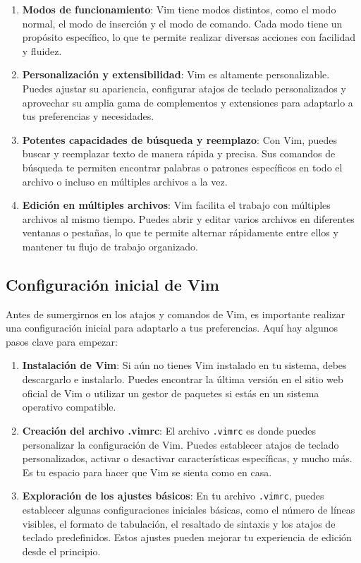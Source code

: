 \documentclass[
  doc,
  floatsintext,
  longtable,
  a4paper,
  nolmodern,
  notxfonts,
  notimes,
  colorlinks=true,linkcolor=blue,citecolor=blue,urlcolor=blue]{apa7}
\begin{document}
\begin{enumerate}
\def\labelenumi{\arabic{enumi}.}
\item
  \textbf{Modos de funcionamiento}: Vim tiene modos distintos, como el
  modo normal, el modo de inserción y el modo de comando. Cada modo
  tiene un propósito específico, lo que te permite realizar diversas
  acciones con facilidad y fluidez.
\item
  \textbf{Personalización y extensibilidad}: Vim es altamente
  personalizable. Puedes ajustar su apariencia, configurar atajos de
  teclado personalizados y aprovechar su amplia gama de complementos y
  extensiones para adaptarlo a tus preferencias y necesidades.
\item
  \textbf{Potentes capacidades de búsqueda y reemplazo}: Con Vim, puedes
  buscar y reemplazar texto de manera rápida y precisa. Sus comandos de
  búsqueda te permiten encontrar palabras o patrones específicos en todo
  el archivo o incluso en múltiples archivos a la vez.
\item
  \textbf{Edición en múltiples archivos}: Vim facilita el trabajo con
  múltiples archivos al mismo tiempo. Puedes abrir y editar varios
  archivos en diferentes ventanas o pestañas, lo que te permite alternar
  rápidamente entre ellos y mantener tu flujo de trabajo organizado.
\end{enumerate}

\subsection{Configuración inicial de
Vim}\label{configuraciuxf3n-inicial-de-vim}

Antes de sumergirnos en los atajos y comandos de Vim, es importante
realizar una configuración inicial para adaptarlo a tus preferencias.
Aquí hay algunos pasos clave para empezar:

\begin{enumerate}
\def\labelenumi{\arabic{enumi}.}
\item
  \textbf{Instalación de Vim}: Si aún no tienes Vim instalado en tu
  sistema, debes descargarlo e instalarlo. Puedes encontrar la última
  versión en el sitio web oficial de Vim o utilizar un gestor de
  paquetes si estás en un sistema operativo compatible.
\item
  \textbf{Creación del archivo .vimrc}: El archivo \texttt{.vimrc} es
  donde puedes personalizar la configuración de Vim. Puedes establecer
  atajos de teclado personalizados, activar o desactivar características
  específicas, y mucho más. Es tu espacio para hacer que Vim se sienta
  como en casa.
\item
  \textbf{Exploración de los ajustes básicos}: En tu archivo
  \texttt{.vimrc}, puedes establecer algunas configuraciones iniciales
  básicas, como el número de líneas visibles, el formato de tabulación,
  el resaltado de sintaxis y los atajos de teclado predefinidos. Estos
  ajustes pueden mejorar tu experiencia de edición desde el principio.
\end{enumerate}
\end{document}
